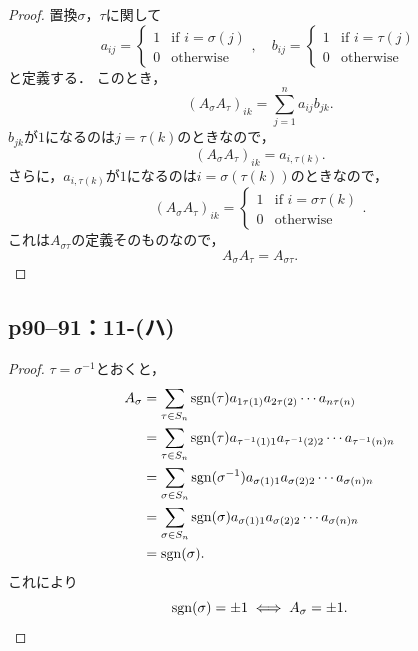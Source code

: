 \documentclass[a4paper,10pt,fleqn]{ltjsarticle}
\begin{document}
\begin{tleftbar}
    \begin{proof}
        置換$\sigma$，$\tau$に関して
        \[
            a_{ij} =
            \begin{cases}
                1 & \text{if } i = \sigma(j) \\
                0 & \text{otherwise}
            \end{cases},
            \quad
            b_{ij}=
            \begin{cases}
                1 & \text{if } i = \tau(j) \\
                0 & \text{otherwise}
            \end{cases}
        \]
        と定義する．
        このとき，
        \[
            (A_\sigma A_\tau)_{ik} = \sum_{j=1}^n a_{ij} b_{jk}.
        \]
        $b_{jk}$が$1$になるのは$j= \tau(k)$のときなので，
        \[
            (A_\sigma A_\tau)_{ik} = a_{i, \tau(k)}.
        \]
        さらに，$a_{i, \tau(k)}$が$1$になるのは$i = \sigma(\tau(k))$のときなので，
        \[
            (A_\sigma A_\tau)_{ik} =
            \begin{cases}
                1 & \text{if } i=\sigma \tau(k) \\
                0 & \text{otherwise}
            \end{cases}.
        \]
        これは$A_{\sigma \tau}$の定義そのものなので，
        \[
            A_\sigma A_\tau = A_{\sigma \tau}.
        \]
    \end{proof}
\end{tleftbar}


\subsection*{p90--91：11-(ハ)}

\begin{tleftbar}
    \begin{proof}
        $ \tau = \sigma^{-1}$とおくと，
        \begin{align*}
            A_\sigma & = \sum_{ \tau \in S_n} \operatorname{sgn}  (\tau) a_{1 \tau(1)} a_{2 \tau(2)} \cdots a_{n \tau(n)}               \\
                     & = \sum_{ \tau \in S_n} \operatorname{sgn}  (\tau) a_{\tau^{-1}(1)1} a_{\tau^{-1} (2)2} \cdots a_{\tau^{-1} (n)n} \\
                     & = \sum_{\sigma \in S_n} \operatorname{sgn} (\sigma^{-1}) a_{\sigma(1)1} a_{\sigma(2)2} \cdots a_{\sigma(n)n}     \\
                     & = \sum_{\sigma \in S_n} \operatorname{sgn} (\sigma) a_{\sigma(1)1} a_{\sigma(2)2} \cdots a_{\sigma(n)n}          \\
                     & = \operatorname{sgn} (\sigma).
        \end{align*}
        これにより
        \[
            \operatorname{sgn} (\sigma) = \pm 1 \iff A_\sigma = \pm 1.
        \]
    \end{proof}
\end{tleftbar}
\newpage
\end{document}
